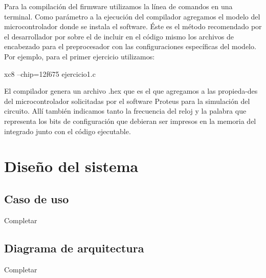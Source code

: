 \documentclass[a4paper]{article}
\begin{document}
Para la compilación del firmware utilizamos la línea de comandos en 
una terminal. Como parámetro a la ejecución del compilador agregamos
el modelo del microcontrolador donde se instala el software. Éste es 
el método recomendado por el desarrollador por sobre el de incluir en 
el código mismo los archivos de encabezado para el preprocesador con 
las configuraciones específicas del modelo. Por ejemplo, para el 
primer ejercicio utilizamos:

\begin{center}\ttfamily 
	xc8 --chip=12f675 ejercicio1.c
\end{center}

El compilador genera un archivo {\ttfamily .hex} que es el que
agregamos a las propieda-des del microcontrolador solicitadas 
por el software Proteus para la simulación del circuito. Allí también 
indicamos tanto la frecuencia del reloj y la palabra que representa 
los bits de configuración que debieran ser impresos en la memoria del
integrado junto con el código ejecutable. 

\section{Diseño del sistema}

    \subsection{Caso de uso}

    Completar

    \subsection{Diagrama de arquitectura}

    Completar
\end{document}
